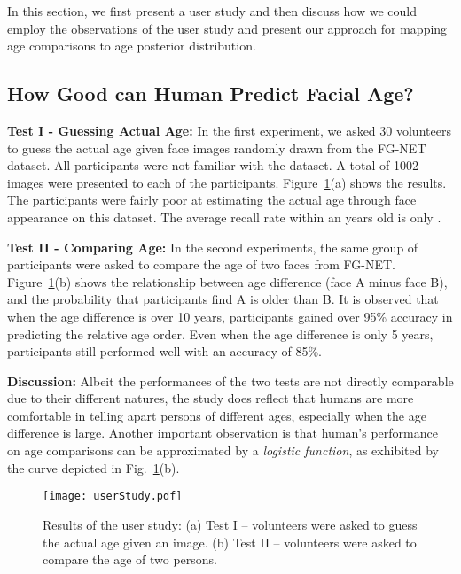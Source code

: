 \documentclass{bmvc2k}
\begin{document}
In this section, we first present a user study and then discuss how we could employ the observations of the user study and present our approach for mapping age comparisons to age posterior distribution.

\vspace{-0.2cm}

\subsection{How Good can Human Predict Facial Age?}
\label{subsec:user_study}

\noindent \textbf{Test I - Guessing Actual Age:} 
In the first experiment, we asked 30 volunteers to guess the actual age given face images randomly drawn from the FG-NET~\cite{panis2014overview} dataset. All participants were not familiar with the dataset. A total of 1002 images were presented to each of the participants. Figure~\ref{fig:user_study}(a) shows the results. The participants were fairly poor at estimating the actual age through face appearance on this dataset. The average recall rate within an  years old is only . 


\vspace{0.1cm}
\noindent \textbf{Test II - Comparing Age:} 
In the second experiments, the same group of participants were asked to compare the age of two faces from FG-NET. Figure~\ref{fig:user_study}(b) shows the relationship between age difference (face A minus face B), and the probability that participants find A is older than B. It is observed that when the age difference is over 10 years, participants gained over 95\% accuracy in predicting the relative age order. Even when the age difference is only 5 years, participants still performed well with an accuracy of 85\%.

\vspace{0.1cm}
\noindent \textbf{Discussion:} 
Albeit the performances of the two tests are not directly comparable due to their different natures, the study does reflect that humans are more comfortable in telling apart persons of different ages, especially when the age difference is large.
Another important observation is that human's performance on age comparisons can be approximated by a \textit{logistic function}, as exhibited by the curve depicted in Fig.~\ref{fig:user_study}(b).

\begin{figure}[t]
\begin{center}
\texttt{[image: userStudy.pdf]}
\vskip -0.4cm
\caption{Results of the user study: (a) Test I -- volunteers were asked to guess the actual age given an image. (b) Test II -- volunteers were asked to compare the age of two persons.}
\vspace{-0.5cm}
\label{fig:user_study}
\end{center}
\end{figure}
\end{document}
